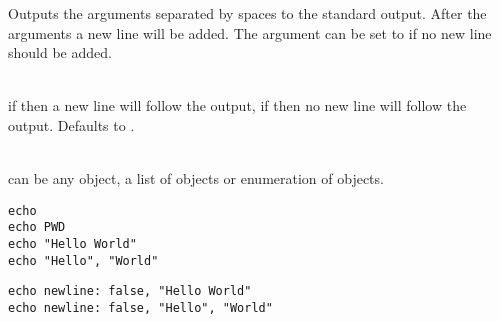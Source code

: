 %


Outputs the arguments separated by spaces to the standard output. After 
the arguments a new line will be added. The argument  can be set
to  if no new line should be added.

\begin{asparadesc}
%
\item[\code{newLine: true|false}]  \hfill \\
if  then a new line will follow the output,
if  then no new line will follow the output. Defaults to .
%
\item[\code{arguments\dots}]  \hfill \\
can be any object, a list of objects or enumeration of objects.
%
\end{asparadesc}

\begin{lstlisting}[style=Groovybash, label={lst:example_echo1}, title={%
Print the message to the standard output with an additional line break.}]
echo
echo PWD
echo "Hello World"
echo "Hello", "World"
\end{lstlisting}

\begin{lstlisting}[style=Groovybash, label={lst:example_echo2}, title={%
Print the message to the standard output with surpressed line break.}]
echo newline: false, "Hello World"
echo newline: false, "Hello", "World"
\end{lstlisting}

